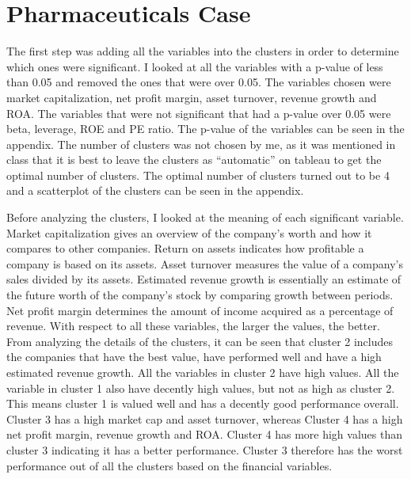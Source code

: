 \documentclass[11pt]{article}
\begin{document}
\section{Pharmaceuticals Case}
The first step was adding all the variables into the clusters in order to determine which ones were significant. I looked at all the variables with a p-value of less than 0.05 and removed the ones that were over 0.05. The variables chosen were market capitalization, net profit margin, asset turnover, revenue growth and ROA. The variables that were not significant that had a p-value over 0.05 were beta, leverage, ROE and PE ratio. The p-value of the variables can be seen in the appendix. The number of clusters was not chosen by me, as it was mentioned in class that it is best to leave the clusters as “automatic” on tableau to get the optimal number of clusters. The optimal number of clusters turned out to be 4 and a scatterplot of the clusters can be seen in the appendix.

Before analyzing the clusters, I looked at the meaning of each significant variable. Market capitalization gives an overview of the company’s worth and how it compares to other companies. Return on assets indicates how profitable a company is based on its assets. Asset turnover measures the value of a company’s sales divided by its assets. Estimated revenue growth is essentially an estimate of the future worth of the company’s stock by comparing growth between periods. Net profit margin determines the amount of income acquired as a percentage of revenue. With respect to all these variables, the larger the values, the better. From analyzing the details of the clusters, it can be seen that cluster 2 includes the companies that have the best value, have performed well and have a high estimated revenue growth. All the variables in cluster 2 have high values. All the variable in cluster 1 also have decently high values, but not as high as cluster 2.  This means cluster 1 is valued well and has a decently good performance overall. Cluster 3 has a high market cap and asset turnover, whereas Cluster 4 has a high net profit margin, revenue growth and ROA. Cluster 4 has more high values than cluster 3 indicating it has a better performance. Cluster 3 therefore has the worst performance out of all the clusters based on the financial variables. 
	
\end{document}
